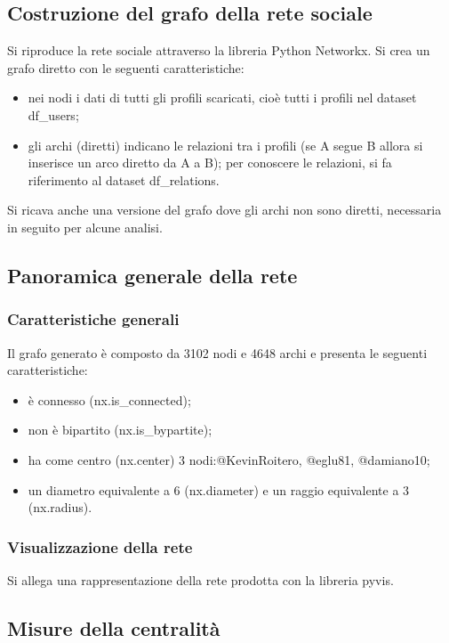 \documentclass[a4paper, 12pt, twoside]{article}
\begin{document}
\subsection{Costruzione del grafo della rete sociale}
Si riproduce la rete sociale attraverso la libreria Python Networkx. Si crea un grafo diretto con le seguenti caratteristiche:
\begin{itemize}
    \item nei nodi i dati di tutti gli profili scaricati, cioè tutti i profili nel dataset df\_users;
    \item gli archi (diretti) indicano le relazioni tra i profili (se A segue B allora si inserisce un arco diretto da A a B); per conoscere le relazioni, si fa riferimento al dataset df\_relations.
\end{itemize}
Si ricava anche una versione del grafo dove gli archi non sono diretti, necessaria in seguito per alcune analisi.


\subsection{Panoramica generale della rete}

\subsubsection{Caratteristiche generali}
Il grafo generato è composto da 3102 nodi e 4648 archi e presenta le seguenti caratteristiche:
\begin{itemize}
    \item è connesso (nx.is\_connected);
    \item non è bipartito (nx.is\_bypartite);
    \item ha come centro (nx.center) 3 nodi:@KevinRoitero, @eglu81, @damiano10;
    \item un diametro equivalente a 6 (nx.diameter) e un raggio equivalente a 3 (nx.radius).
\end{itemize}

\subsubsection{Visualizzazione della rete}
Si allega una rappresentazione della rete prodotta con la libreria pyvis.


\subsection{Misure della centralità}
\end{document}
